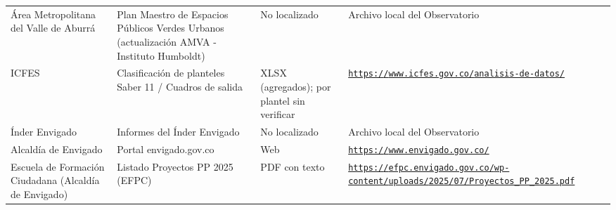 \documentclass[11pt,letterpaper]{article}
\begin{document}
{\begin{xltabular}{\linewidth}{L{2.8cm}YL{1.6cm}Y}
Área Metropolitana del Valle de Aburrá & Plan Maestro de Espacios Públicos Verdes Urbanos (actualización AMVA - Instituto Humboldt) & No localizado & Archivo local del Observatorio \\
ICFES & Clasificación de planteles Saber 11 /\allowbreak{} Cuadros de salida & XLSX (agregados); por plantel sin verificar & \texttt{\footnotesize \href{https://www.icfes.gov.co/analisis-de-datos/}{https:/\allowbreak{}}\allowbreak{}\href{https://www.icfes.gov.co/analisis-de-datos/}{/\allowbreak{}}\allowbreak{}\href{https://www.icfes.gov.co/analisis-de-datos/}{www.\allowbreak{}icfes.\allowbreak{}gov.\allowbreak{}co/\allowbreak{}}\allowbreak{}\href{https://www.icfes.gov.co/analisis-de-datos/}{analisis-\allowbreak{}de-\allowbreak{}datos/\allowbreak{}}} \\
Índer Envigado & Informes del Índer Envigado & No localizado & Archivo local del Observatorio \\
Alcaldía de Envigado & Portal envigado.\allowbreak{}gov.\allowbreak{}co & Web & \texttt{\footnotesize \href{https://www.envigado.gov.co/}{https:/\allowbreak{}}\allowbreak{}\href{https://www.envigado.gov.co/}{/\allowbreak{}}\allowbreak{}\href{https://www.envigado.gov.co/}{www.\allowbreak{}envigado.\allowbreak{}gov.\allowbreak{}co/\allowbreak{}}} \\
Escuela de Formación Ciudadana (Alcaldía de Envigado) & Listado Proyectos PP 2025 (EFPC) & PDF con texto & \texttt{\footnotesize \href{https://efpc.envigado.gov.co/wp-content/uploads/2025/07/Proyectos_PP_2025.pdf}{https:/\allowbreak{}}\allowbreak{}\href{https://efpc.envigado.gov.co/wp-content/uploads/2025/07/Proyectos_PP_2025.pdf}{/\allowbreak{}}\allowbreak{}\href{https://efpc.envigado.gov.co/wp-content/uploads/2025/07/Proyectos_PP_2025.pdf}{efpc.\allowbreak{}envigado.\allowbreak{}gov.\allowbreak{}co/\allowbreak{}}\allowbreak{}\href{https://efpc.envigado.gov.co/wp-content/uploads/2025/07/Proyectos_PP_2025.pdf}{wp-\allowbreak{}content/\allowbreak{}}\allowbreak{}\href{https://efpc.envigado.gov.co/wp-content/uploads/2025/07/Proyectos_PP_2025.pdf}{uploads/\allowbreak{}}\allowbreak{}\href{https://efpc.envigado.gov.co/wp-content/uploads/2025/07/Proyectos_PP_2025.pdf}{2025/\allowbreak{}}\allowbreak{}\href{https://efpc.envigado.gov.co/wp-content/uploads/2025/07/Proyectos_PP_2025.pdf}{07/\allowbreak{}}\allowbreak{}\href{https://efpc.envigado.gov.co/wp-content/uploads/2025/07/Proyectos_PP_2025.pdf}{Proyectos\_\allowbreak{}PP\_\allowbreak{}2025.\allowbreak{}pdf}} \\

\end{xltabular}}
\end{document}
